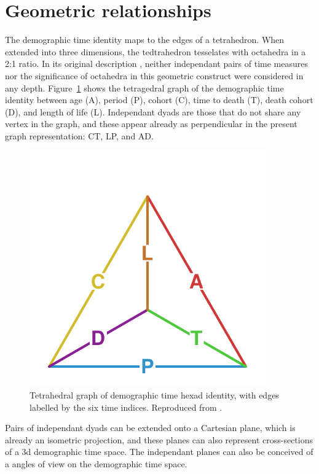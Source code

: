 \section{Geometric relationships}
The demographic time identity maps to the edges of a tetrahedron. When extended
into three dimensions, the tedtrahedron tesselates with octahedra in a 2:1
ratio. In its original description \citep{riffe2017demographictime}, neither
independant pairs of time measures nor the significance of octahedra in this
geometric construct were considered in any depth. Figure~\ref{fig:tet}
shows the tetragedral graph of the demographic time identity between age
(A), period (P), cohort (C), time to death (T), death cohort (D), and length
of life (L). Independant dyads are those that do not share any vertex in the
graph, and these appear already as perpendicular in the present graph
representation: CT, LP, and AD.

\begin{figure}[h!]
\centering
\caption{Tetrahedral graph of demographic time hexad identity, with edges
labelled by the six time indices. Reproduced from 
\citet{riffe2017demographictime}.}
\label{fig:tet}
\includegraphics[width=4in]{Figures/TetraHedronEdgesOnly.pdf}%
\end{figure}

Pairs of independant dyads can be extended onto a Cartesian plane, which is
already an isometric projection, and these planes can also represent
cross-sections of a 3d demographic time space. The independant planes can also
be conceived of a angles of view on the demographic time space. 

